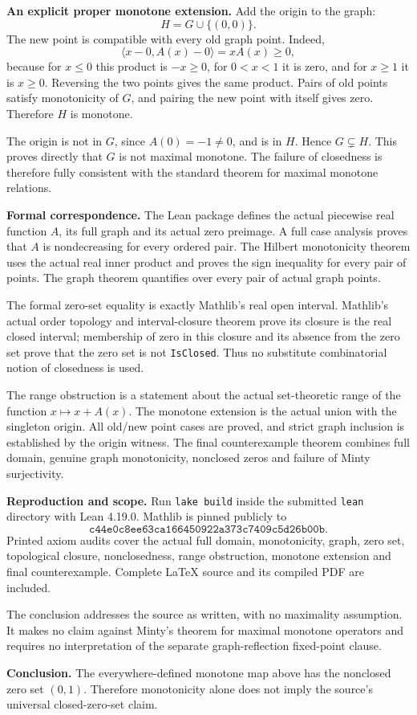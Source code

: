 \documentclass[11pt]{article}
\begin{document}
\newpage
\noindent\textbf{An explicit proper monotone extension.}
Add the origin to the graph:
\[
 H=G\cup\{(0,0)\}.
\]
The new point is compatible with every old graph point. Indeed,
\[
 \langle x-0,A(x)-0\rangle=xA(x)\ge0,
\]
because for $x\le0$ this product is $-x\ge0$, for $0<x<1$ it is zero, and for $x\ge1$ it is $x\ge0$. Reversing the two points gives the same product. Pairs of old points satisfy monotonicity of $G$, and pairing the new point with itself gives zero. Therefore $H$ is monotone.

The origin is not in $G$, since $A(0)=-1\ne0$, and is in $H$.
Hence $G\subsetneq H$. This proves directly that $G$ is not maximal monotone. The failure of closedness is therefore fully consistent with the standard theorem for maximal monotone relations.

\medskip
\noindent\textbf{Formal correspondence.}
The Lean package defines the actual piecewise real function $A$, its full graph and its actual zero preimage. A full case analysis proves that $A$ is nondecreasing for every ordered pair. The Hilbert monotonicity theorem uses the actual real inner product and proves the sign inequality for every pair of points. The graph theorem quantifies over every pair of actual graph points.

The formal zero-set equality is exactly Mathlib's real open interval.
Mathlib's actual order topology and interval-closure theorem prove its closure is the real closed interval; membership of zero in this closure and its absence from the zero set prove that the zero set is not \texttt{IsClosed}. Thus no substitute combinatorial notion of closedness is used.

The range obstruction is a statement about the actual set-theoretic range of the function $x\mapsto x+A(x)$. The monotone extension is the actual union with the singleton origin. All old/new point cases are proved, and strict graph inclusion is established by the origin witness. The final counterexample theorem combines full domain, genuine graph monotonicity, nonclosed zeros and failure of Minty surjectivity.

\medskip
\noindent\textbf{Reproduction and scope.}
Run \texttt{lake build} inside the submitted \texttt{lean} directory with Lean 4.19.0. Mathlib is pinned publicly to
\[
 \texttt{c44e0c8ee63ca166450922a373c7409c5d26b00b}.
\]
Printed axiom audits cover the actual full domain, monotonicity, graph, zero set, topological closure, nonclosedness, range obstruction, monotone extension and final counterexample. Complete LaTeX source and its compiled PDF are included.

The conclusion addresses the source as written, with no maximality assumption. It makes no claim against Minty's theorem for maximal monotone operators and requires no interpretation of the separate graph-reflection fixed-point clause.

\medskip
\noindent\textbf{Conclusion.}
The everywhere-defined monotone map above has the nonclosed zero set $(0,1)$. Therefore monotonicity alone does not imply the source's universal closed-zero-set claim.
\end{document}
